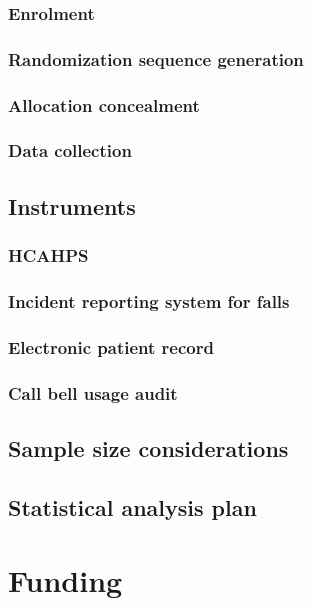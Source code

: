 \documentclass[12pt]{article}
\begin{document}
\subsubsection{Enrolment}

\subsubsection{Randomization sequence generation}

\subsubsection{Allocation concealment}

\subsubsection{Data collection}

\subsection{Instruments}

\subsubsection{HCAHPS}
\subsubsection{Incident reporting system for falls}
\subsubsection{Electronic patient record}
\subsubsection{Call bell usage audit}

\subsection{Sample size considerations}

\subsection{Statistical analysis plan}

\section{Funding}
\end{document}
